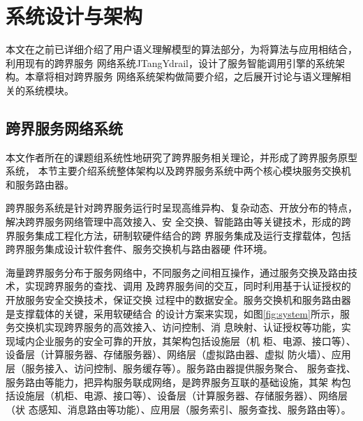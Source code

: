 \chapter{系统设计与架构}
本文在之前已详细介绍了用户语义理解模型的算法部分，为将算法与应用相结合，利用现有的跨界服务
网络系统JTangYdrail，设计了服务智能调用引擎的系统架构。本章将相对跨界服务
网络系统架构做简要介绍，之后展开讨论与语义理解相关的系统模块。

\section{跨界服务网络系统}
本文作者所在的课题组系统性地研究了跨界服务相关理论，并形成了跨界服务原型系统，
本节主要介绍系统整体架构以及跨界服务系统中两个核心模块服务交换机和服务路由器\cite{zheng2020service}。

  跨界服务系统是针对跨界服务运行时呈现高维异构、复杂动态、开放分布的特点，解决跨界服务网络管理中高效接入、安
  全交换、智能路由等关键技术，形成的跨界服务集成工程化方法，研制软硬件结合的跨
  界服务集成及运行支撑载体，包括跨界服务集成设计软件套件、服务交换机与路由器硬
  件环境。

  海量跨界服务分布于服务网络中，不同服务之间相互操作，通过服务交换及路由技术，实现跨界服务的查找、调用
  及跨界服务间的交互，同时利用基于认证授权的开放服务安全交换技术，保证交换
  过程中的数据安全。服务交换机和服务路由器是支撑载体的关键，采用软硬结合
  的设计方案来实现，如图\ref{fig:system}所示，服务交换机实现跨界服务的高效接入、访问控制、消
  息映射、认证授权等功能，实现域内企业服务的安全可靠的开放，其架构包括设施层（机
  柜、电源、接口等）、设备层（计算服务器、存储服务器）、网络层（虚拟路由器、虚拟
  防火墙）、应用层（服务接入、访问控制、服务缓存等）\cite{刘皇敏2019跨界服务网络关键技术研究}。服务路由器提供服务聚合、
  服务查找、服务路由等能力，把异构服务联成网络，是跨界服务互联的基础设施，其架
  构包括设施层（机柜、电源、接口等）、设备层（计算服务器、存储服务器）、网络层（状
  态感知、消息路由等功能）、应用层（服务索引、服务查找、服务路由等）。

